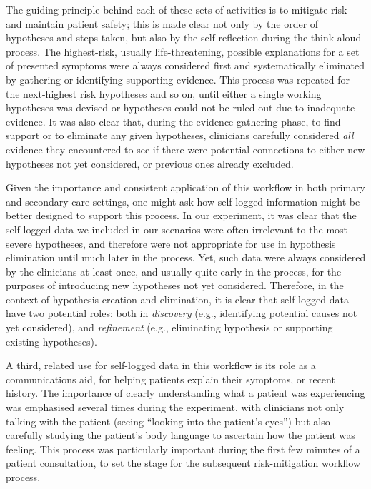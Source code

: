 \documentclass{sigchi}
\begin{document}
The guiding principle behind each of these sets of activities is to mitigate risk and maintain patient safety;  this is made clear not only by the order of hypotheses and steps taken, but also by the self-reflection during the think-aloud process. The highest-risk, usually life-threatening, possible explanations for a set of presented symptoms were always considered first and systematically eliminated by gathering or identifying supporting evidence.  This process was repeated for the next-highest risk hypotheses and so on, until either a single working hypotheses was devised or hypotheses could not be ruled out due to inadequate evidence. It was also clear that, during the evidence gathering phase, to find support or to eliminate any given hypotheses, clinicians carefully considered \emph{all} evidence they encountered to see if there were potential connections to either new hypotheses not yet considered, or previous ones already excluded.

Given the importance and consistent application of this workflow in both primary and secondary care settings, one might ask how self-logged information might be better designed to support this process. In our experiment, it was clear that the self-logged data we included in our scenarios were often irrelevant to the most severe hypotheses, and therefore were not appropriate for use in hypothesis elimination until much later in the process.  Yet, such data were always considered by the clinicians at least once, and usually quite early in the process, for the purposes of introducing new hypotheses not yet considered.  Therefore, in the context of hypothesis creation and elimination, it is clear that self-logged data have two potential roles: both in \emph{discovery} (e.g., identifying potential causes not yet considered), and \emph{refinement} (e.g., eliminating hypothesis or supporting existing hypotheses).

A third, related use for self-logged data in this workflow is its role as a communications aid, for helping patients explain their symptoms, or recent history.  The importance of clearly understanding what a patient was experiencing was emphasised several times during the experiment, with clinicians not only talking with the patient (seeing ``looking into the patient's eyes'') but also carefully studying the patient's body language to ascertain how the patient was feeling.  This process was particularly important during the first few minutes of a patient consultation, to set the stage for the subsequent risk-mitigation workflow process.
\end{document}
